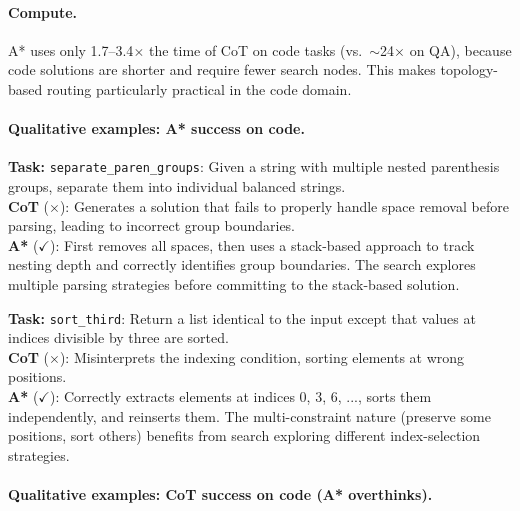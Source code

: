 \documentclass[10pt]{article}
\begin{document}
{\paragraph{Compute.}
A* uses only 1.7--3.4$\times$ the time of CoT on code tasks (vs.\ $\sim$24$\times$ on QA), because code solutions are shorter and require fewer search nodes. This makes topology-based routing particularly practical in the code domain.

\paragraph{Qualitative examples: A* success on code.}

\begin{examplebox}[title=HumanEval/1 --- A* Correct{,} CoT Wrong]
\textbf{Task:} \texttt{separate\_paren\_groups}: Given a string with multiple nested parenthesis groups, separate them into individual balanced strings.\\[4pt]
\textbf{CoT} ($\times$): Generates a solution that fails to properly handle space removal before parsing, leading to incorrect group boundaries.\\[4pt]
\textbf{A*} ($\checkmark$): First removes all spaces, then uses a stack-based approach to track nesting depth and correctly identifies group boundaries. The search explores multiple parsing strategies before committing to the stack-based solution.
\end{examplebox}

\begin{examplebox}[title=HumanEval/33 --- A* Correct{,} CoT Wrong]
\textbf{Task:} \texttt{sort\_third}: Return a list identical to the input except that values at indices divisible by three are sorted.\\[4pt]
\textbf{CoT} ($\times$): Misinterprets the indexing condition, sorting elements at wrong positions.\\[4pt]
\textbf{A*} ($\checkmark$): Correctly extracts elements at indices 0, 3, 6, ..., sorts them independently, and reinserts them. The multi-constraint nature (preserve some positions, sort others) benefits from search exploring different index-selection strategies.
\end{examplebox}

\paragraph{Qualitative examples: CoT success on code (A* overthinks).}

}
\end{document}
